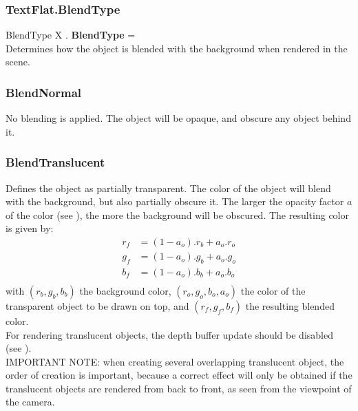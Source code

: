 \subsubsection{TextFlat.BlendType \label{F:TextFlat:BlendType}}
BlendType X . \textbf{BlendType} = \\
Determines how the object is blended with the background when rendered in the scene.

\subsubsection{BlendNormal \label{T:BlendType|BlendNormal}}
No blending is applied. The object will be opaque, and obscure any object behind it.

\subsubsection{BlendTranslucent \label{T:BlendType|BlendTranslucent}}
Defines the object as partially transparent. The color of the object will blend with the background, but also partially obscure it. The larger the opacity factor $a$ of the color (see ), the more the background will be obscured. The resulting color is given by:
\begin{equation}
\begin{array}{rcl}
r_f & = (1-a_o) . r_b + a_o . r_o \\
g_f & = (1-a_o) . g_b + a_o . g_o \\
b_f & = (1-a_o) . b_b + a_o . b_o \\
\end{array}
\end{equation}
with $(r_b,g_b,b_b)$ the background color, $(r_o,g_o,b_o,a_o)$ the color of the transparent object to be drawn on top, and $(r_f,g_f,b_f)$ the resulting blended color. \\
For rendering translucent objects, the depth buffer update should be disabled (see ). \\
IMPORTANT NOTE: when creating several overlapping translucent object, the order of creation is important, because a correct effect will only be obtained if the translucent objects are rendered from back to front, as seen from the viewpoint of the camera.

